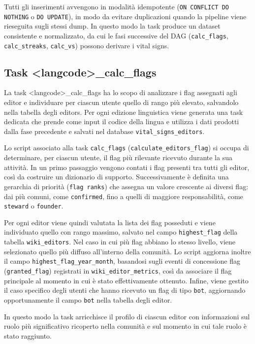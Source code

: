 Tutti gli inserimenti avvengono in modalità idempotente (\texttt{ON CONFLICT DO NOTHING} o \texttt{DO UPDATE}), in modo da evitare duplicazioni quando la pipeline viene rieseguita sugli stessi dump. 
In questo modo la task produce un dataset consistente e normalizzato, da cui le fasi successive del DAG (\texttt{calc\_flags}, \texttt{calc\_streaks}, \texttt{calc\_vs}) possono derivare i vital signs.

\subsection{Task \textless langcode\textgreater\_calc\_flags}
\label{subsec:calc_flags}

La task \textless langcode\textgreater\_calc\_flags ha lo scopo di analizzare i flag assegnati agli editor
e individuare per ciascun utente quello di rango più elevato,
salvandolo nella tabella degli editors.
Per ogni edizione linguistica viene generata una task dedicata che prende come input il codice della lingua e utilizza i dati prodotti dalla fase precedente e salvati nel database \texttt{vital\_signs\_editors}.

Lo script associato alla task \texttt{calc\_flags} (\texttt{calculate\_editors\_flag}) si occupa di determinare, per ciascun utente, il flag più rilevante ricevuto durante la sua attività. In un primo passaggio vengono contati i flag presenti tra tutti gli editor, così da costruire un dizionario di supporto. Successivamente è definita una gerarchia di priorità (\texttt{flag ranks}) che assegna un valore crescente ai diversi flag: dai più comuni, come \texttt{confirmed}, fino a quelli di maggiore responsabilità, come \texttt{steward} o \texttt{founder}.

Per ogni editor viene quindi valutata la lista dei flag posseduti e viene individuato quello con rango massimo, salvato nel campo \texttt{highest\_flag} della tabella \texttt{wiki\_editors}. Nel caso in cui più flag abbiano lo stesso livello, viene selezionato quello più diffuso all’interno della comunità. Lo script aggiorna inoltre il campo \texttt{highest\_flag\_year\_month}, basandosi sugli eventi di concessione flag (\texttt{granted\_flag}) registrati in \texttt{wiki\_editor\_metrics}, così da associare il flag principale al momento in cui è stato effettivamente ottenuto. Infine, viene gestito il caso specifico degli utenti che hanno ricevuto un flag di tipo \texttt{bot}, aggiornando opportunamente il campo \texttt{bot} nella tabella degli editor.

In questo modo la task arricchisce il profilo di ciascun editor con informazioni sul ruolo più significativo ricoperto nella comunità e sul momento in cui tale ruolo è stato raggiunto.

